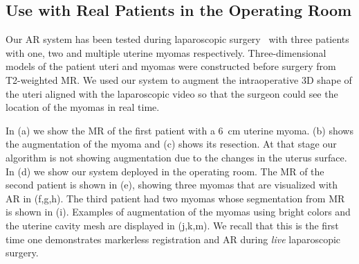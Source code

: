 \subsection{Use with Real Patients in the Operating Room}
Our AR system has been tested during laparoscopic surgery~\cite{bourdel2017} with three patients with one, two and multiple uterine myomas respectively. Three-dimensional models of the patient uteri and myomas were constructed before surgery from T2-weighted MR. We used our system to augment the intraoperative 3D shape of the uteri aligned with the laparoscopic video
so that the surgeon could see the location of the myomas in real time. 

In (a) we show the MR of the first patient with a 6~cm uterine myoma. (b) shows the augmentation of the myoma and (c) shows its resection. At that stage our algorithm is not showing augmentation due to the changes in the uterus surface. In (d) we show our system deployed in the operating room. The MR of the second patient is shown in (e), showing three myomas that are visualized with AR in (f,g,h). The third patient had two myomas whose segmentation from MR is shown in (i). Examples of augmentation of the myomas using bright colors and the uterine cavity mesh are displayed in (j,k,m). We recall that this is the first time one demonstrates markerless registration and AR during \emph{live} laparoscopic surgery.     
 

